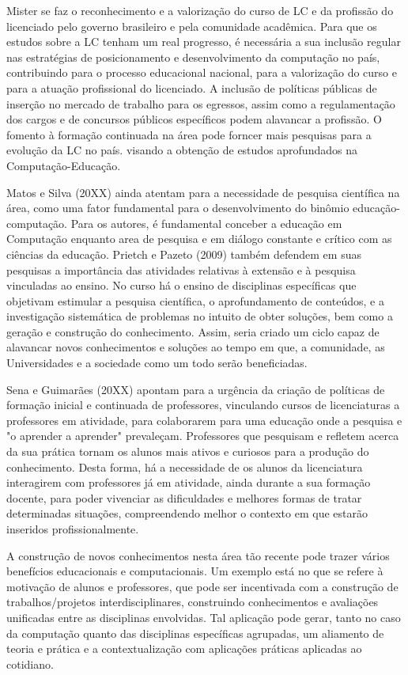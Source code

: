     
    Mister se faz o reconhecimento e a valorização do curso de LC e da profissão do licenciado pelo  governo brasileiro e pela comunidade acadêmica. Para que os estudos sobre a LC tenham um real progresso, é necessária a sua inclusão regular nas estratégias de posicionamento e desenvolvimento da computação no país, contribuindo para o processo educacional nacional, para a valorização do curso e para a atuação profissional do licenciado. A inclusão de políticas públicas de inserção no mercado de trabalho para os egressos, assim como a regulamentação dos cargos e de concursos públicos específicos podem alavancar a profissão. O fomento à formação continuada na área pode forncer mais pesquisas para a evolução da LC no país. visando a obtenção de estudos aprofundados na Computação-Educação.
	
    
    Matos e Silva (20XX) ainda atentam para a necessidade de pesquisa científica na área, como uma fator fundamental para o desenvolvimento do binômio educação-computação. Para os autores, é fundamental conceber a educação em Computação enquanto area de pesquisa e em diálogo constante e crítico com as ciências da educação. Prietch e Pazeto (2009) também defendem em suas pesquisas a importância das  atividades relativas à extensão e à pesquisa vinculadas ao ensino. No curso há o ensino de disciplinas específicas que objetivam estimular a pesquisa científica, o aprofundamento de conteúdos, e a investigação sistemática de problemas no intuito de obter soluções, bem como a geração e construção do conhecimento. Assim, seria criado um ciclo capaz de alavancar novos conhecimentos e soluções ao tempo em que, a comunidade, as Universidades e a sociedade como um todo serão beneficiadas.
	
    
    Sena e Guimarães (20XX) apontam para a urgência da criação de políticas de formação inicial e continuada de professores, vinculando cursos de licenciaturas a professores em atividade, para colaborarem para uma educação onde a pesquisa e "o aprender a aprender" prevaleçam. Professores que pesquisam e refletem acerca da sua prática tornam os alunos mais ativos e curiosos para a produção do conhecimento. Desta forma, há a necessidade de os alunos da licenciatura interagirem com professores já em atividade, ainda durante a sua formação docente, para poder vivenciar as dificuldades e melhores formas de tratar determinadas situações, compreendendo melhor o contexto em que estarão inseridos profissionalmente. 
	
    
    A construção de novos conhecimentos nesta área tão recente pode trazer vários benefícios educacionais e computacionais. Um exemplo está no que se refere à motivação de alunos e professores, que pode ser incentivada com a construção de trabalhos/projetos interdisciplinares, construindo conhecimentos e avaliações unificadas entre as disciplinas envolvidas. Tal aplicação pode gerar, tanto no caso da computação quanto das disciplinas específicas agrupadas, um aliamento de teoria e prática e a contextualização com aplicações práticas aplicadas ao cotidiano.
	

